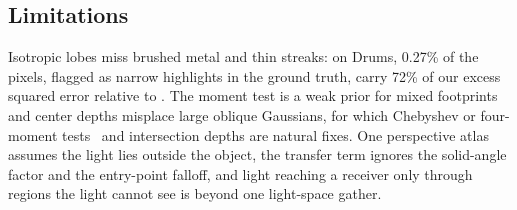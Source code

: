\subsection{Limitations}
\label{sec:limitations}
Isotropic lobes miss brushed metal and thin streaks: on Drums, 0.27\% of the pixels, flagged as narrow highlights in the ground truth, carry 72\% of our excess squared error relative to \gsthree.
The moment test is a weak prior for mixed footprints and center depths misplace large oblique Gaussians, for which Chebyshev or four-moment tests~\cite{donnelly2006variance,peters2015moment} and intersection depths are natural fixes.
One perspective atlas assumes the light lies outside the object, the transfer term ignores the solid-angle factor and the entry-point falloff, and light reaching a receiver only through regions the light cannot see is beyond one light-space gather.
